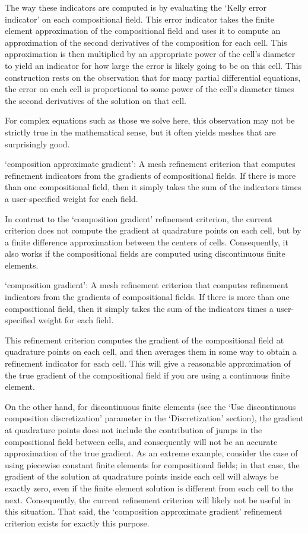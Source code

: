 \begin{itemize}
The way these indicators are computed is by evaluating the `Kelly error indicator' on each compositional field. This error indicator takes the finite element approximation of the compositional field and uses it to compute an approximation of the second derivatives of the composition for each cell. This approximation is then multiplied by an appropriate power of the cell's diameter to yield an indicator for how large the error is likely going to be on this cell. This construction rests on the observation that for many partial differential equations, the error on each cell is proportional to some power of the cell's diameter times the second derivatives of the solution on that cell.

For complex equations such as those we solve here, this observation may not be strictly true in the mathematical sense, but it often yields meshes that are surprisingly good.

`composition approximate gradient': A mesh refinement criterion that computes refinement indicators from the gradients of compositional fields. If there is more than one compositional field, then it simply takes the sum of the indicators times a user-specified weight for each field.

In contrast to the `composition gradient' refinement criterion, the current criterion does not compute the gradient at quadrature points on each cell, but by a finite difference approximation between the centers of cells. Consequently, it also works if the compositional fields are computed using discontinuous finite elements.

`composition gradient': A mesh refinement criterion that computes refinement indicators from the gradients of compositional fields. If there is more than one compositional field, then it simply takes the sum of the indicators times a user-specified weight for each field.

This refinement criterion computes the gradient of the compositional field at quadrature points on each cell, and then averages them in some way to obtain a refinement indicator for each cell. This will give a reasonable approximation of the true gradient of the compositional field if you are using a continuous finite element.

On the other hand, for discontinuous finite elements (see the `Use discontinuous composition discretization' parameter in the `Discretization' section), the gradient at quadrature points does not include the contribution of jumps in the compositional field between cells, and consequently will not be an accurate approximation of the true gradient. As an extreme example, consider the case of using piecewise constant finite elements for compositional fields; in that case, the gradient of the solution at quadrature points inside each cell will always be exactly zero, even if the finite element solution is different from each cell to the next. Consequently, the current refinement criterion will likely not be useful in this situation. That said, the `composition approximate gradient' refinement criterion exists for exactly this purpose.


\end{itemize}
